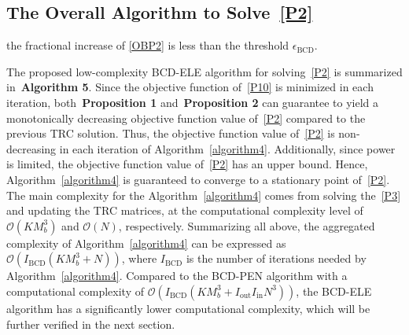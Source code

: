 \documentclass[12pt, draftclsnofoot, onecolumn]{IEEEtran}
\begin{document}
\subsection{The Overall Algorithm to Solve~\eqref{P2}}
\begin{algorithm}[htbp]
\caption{Proposed Low-Complexity BCD-ELE Algorithm}\label{algorithm4}
\begin{algorithmic}[1]
 the fractional increase of \eqref{OBP2} is less than the threshold $\epsilon_{\text{BCD}}$.
\end{algorithmic}
\end{algorithm} 
The proposed low-complexity BCD-ELE algorithm for solving~\eqref{P2} is summarized in~\textbf{Algorithm 5}. {Since the objective function of~\eqref{P10} is minimized in each iteration, both~\textbf{Proposition 1} and~\textbf{Proposition 2} can guarantee to yield a monotonically decreasing objective function value of~\eqref{P2} compared to the previous TRC solution.} Thus, the objective function value of~\eqref{P2} is non-decreasing in each iteration of Algorithm~\ref{algorithm4}. Additionally, since power is limited, the objective function value of~\eqref{P2} has an upper bound. Hence, Algorithm~\ref{algorithm4} is guaranteed to converge to a stationary point of~\eqref{P2}. The main complexity for the Algorithm~\ref{algorithm4} comes from solving the~\eqref{P3} and updating the TRC matrices, at the computational complexity level of $\mathcal{O}\left(K M_b^3\right)$ and $\mathcal{O}\left(N\right)$, respectively. Summarizing all above, the aggregated complexity of Algorithm~\ref{algorithm4} can be expressed as $\mathcal{O}\left({I}_\text{BCD}\left(K M_b^3 +  N\right)\right)$, where ${I}_\text{BCD}$ is the number of iterations needed by Algorithm~\ref{algorithm4}. Compared to the BCD-PEN algorithm with a computational complexity of $\mathcal{O}\left({I}_\text{BCD}\left(K M_b^3 + {I}_\text{out} {I}_\text{in}N^3\right)\right)$, the BCD-ELE algorithm has a significantly lower computational complexity, which will be further verified in the next section. 
\end{document}
